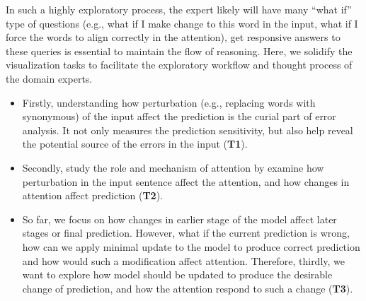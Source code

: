 In such a highly exploratory process, the expert likely will have many ``what if'' type of questions (e.g., what if I make change to this word in the input, what if I force the words to align correctly in the attention), get responsive answers to these queries is essential to maintain the flow of reasoning.
%
Here, we solidify the visualization tasks to facilitate the exploratory workflow and thought process of the domain experts.
%
\begin{itemize}
    \item Firstly, understanding how perturbation (e.g., replacing words with synonymous) of the input affect the prediction is the curial part of error analysis. It not only measures the prediction sensitivity, but also help reveal the potential source of the errors in the input (\textbf{T1}).

    \item Secondly, study the role and mechanism of attention by examine how perturbation in the input sentence affect the attention, and how changes in attention affect prediction (\textbf{T2}).


    \item So far, we focus on how changes in earlier stage of the model affect later stages or final prediction. However, what if the current prediction is wrong, how can we apply minimal update to the model to produce correct prediction and how would such a modification affect attention.
    Therefore, thirdly, we want to explore how model should be updated to produce the desirable change of prediction, and how the attention respond to such a change (\textbf{T3}).
\end{itemize}
%



